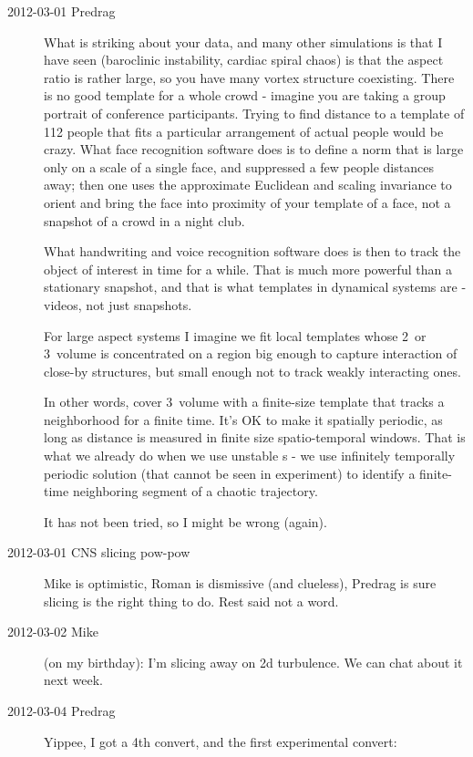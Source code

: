 \begin{description}
\item[2012-03-01 Predrag] What is striking about your data, and many
other simulations is that I have seen (baroclinic instability, cardiac
spiral chaos) is that the aspect ratio is rather large, so you have many
vortex structure coexisting. There is no good template for a whole crowd
- imagine you are taking a group portrait of conference participants.
Trying to find distance to a template of 112 people that fits a
particular arrangement of actual people would be crazy. What face
recognition software does is to define a norm that is large only on a
scale of a single face, and suppressed a few people distances away; then
one uses the approximate Euclidean and scaling invariance to orient and
bring the face into proximity of your template of a face, not a snapshot
of a crowd in a night club.

What handwriting and voice recognition software does is then to track the
object of interest in time for a while. That is much more powerful than a
stationary snapshot, and that is what templates in dynamical systems are
- videos, not just snapshots.

For large aspect systems I imagine we fit local templates whose 2\dmn\
or 3\dmn\ volume is concentrated on a region big enough to capture
interaction of close-by structures, but small enough not to track weakly
interacting ones.

In other words, cover 3\dmn\ volume with a finite-size template that
tracks a neighborhood for a finite time. It's OK to make it spatially
periodic, as long as distance is measured in finite size spatio-temporal
windows. That is what we already do when we use unstable \po s - we use
infinitely temporally periodic solution (that cannot be seen in
experiment) to identify a finite-time neighboring segment of a chaotic
trajectory.

It has not been tried, so I might be wrong (again).

\item[2012-03-01 CNS slicing pow-pow] Mike is optimistic, Roman is
dismissive (and clueless), Predrag is sure slicing is the right thing to
do. Rest said not a word.

\item[2012-03-02 Mike] (on my birthday):
I'm slicing away on 2d turbulence.   We can chat about it next week.

\item[2012-03-04 Predrag] Yippee, I got a 4th convert, and the first
experimental convert:


\end{description}
